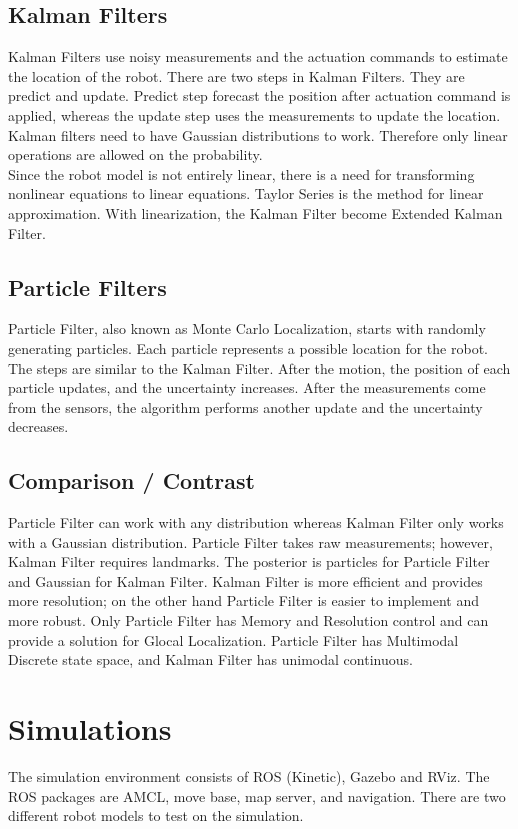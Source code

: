 \documentclass[10pt,journal,compsoc]{IEEEtran}
\begin{document}
\subsection{Kalman Filters}
Kalman Filters use noisy measurements and the actuation commands to estimate the location of the robot. There are two steps in Kalman Filters. They are predict and update. Predict step forecast the position after actuation command is applied, whereas the update step uses the measurements to update the location.
Kalman filters need to have Gaussian distributions to work. Therefore only linear operations are allowed on the probability. \\
Since the robot model is not entirely linear, there is a need for transforming nonlinear equations to linear equations. Taylor Series is the method for linear approximation. With linearization, the Kalman Filter become Extended Kalman Filter. \cite{wiki:kf}

\subsection{Particle Filters}
Particle Filter, also known as Monte Carlo Localization, starts with randomly generating particles. Each particle represents a possible location for the robot. The steps are similar to the Kalman Filter. After the motion, the position of each particle updates, and the uncertainty increases. After the measurements come from the sensors, the algorithm performs another update and the uncertainty decreases.\cite{wiki:pf}
\subsection{Comparison / Contrast}
Particle Filter can work with any distribution whereas Kalman Filter only works with a Gaussian distribution. Particle Filter takes raw measurements; however, Kalman Filter requires landmarks. The posterior is particles for Particle Filter and Gaussian for Kalman Filter. Kalman Filter is more efficient and provides more resolution; on the other hand Particle Filter is easier to implement and more robust. Only Particle Filter has Memory and Resolution control and can provide a solution for Glocal Localization. Particle Filter has Multimodal Discrete state space, and Kalman Filter has unimodal continuous.

\section{Simulations}
The simulation environment consists of ROS (Kinetic), Gazebo and RViz. The ROS packages are AMCL, move base, map server, and navigation. There are two different robot models to test on the simulation.
\end{document}
